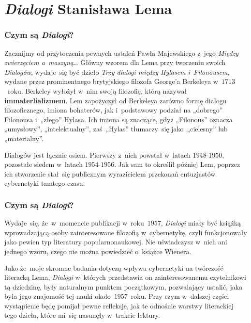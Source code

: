 \documentclass[10pt,t]{beamer}
\begin{document}
\section{\textit{Dialogi} Stanisława Lema}



\begin{frame}
  \frametitle{Czym są \textit{Dialogi}?}


  Zacznijmy od przytoczenia pewnych ustaleń Pawła Majewskiego z~jego
  \textit{Między zwierzęciem a~maszyną\ldots} Główny wzorem dla Lema przy
  tworzeniu swoich \textit{Dialogów}, wydaje~się być dzieło \textit{Trzy
    dialogi między Hylasem i~Filonousem}, wydane przez prominentnego
  brytyjskiego filozofa
  {George’a Berkeleya} w~$1713$~roku. Berkeley wyłożył w~nim swoją
  filozofię, którą nazywał \textbf{immaterlializmem}. Lem zapożyczył od
  Berkeleya zarówno formę dialogu filozoficznego, imiona bohaterów, jak
  i~podstawowy podział na „dobrego” Filonousa i~„złego” Hylasa. Ich imiona
  są znaczące, gdyż „Filonous” oznacza „umysłowy”, „intelektualny”,
  zaś~„Hylas” tłumaczy~się jako~„cielesny” lub „materialny”.

  Dialogów jest łącznie osiem. Pierwszy z~nich powstał w~latach
  $1948\text{-}1950$, pozostałe siedem w~latach $1954\text{-}1956$. Jak sam
  to określił później Lem, poprzez ich stworzenie stał~się publicznym
  wyrazicielem przekonań entuzjastów cybernetyki tamtego czasu.

\end{frame}





\begin{frame}
  \frametitle{Czym są \textit{Dialogi}?}


  Wydaje~się, że~w~momencie publikacji w~roku~$1957$, \textit{Dialogi} miały
  być książką wprowadzającą osoby zainteresowane filozofią w~cybernetykę,
  czyli funkcjonowały jako pewien typ literatury popularnonaukowej.
  Nie uświadczysz w~nich ani jednego wzoru, czego nie można powiedzieć
  o~książce Wienera.

  Jako że~moje skromne badania dotyczą wpływu cybernetyki na twórczość
  literacką Lema, \textit{Dialogi} w~których przedstawia on zainteresowanemu
  czytelnikowi tą dziedzinę, były naturalnym punktem początkowym,
  pozwalający ustalić, jaka była jego znajomość tej nauki
  około~$1957$~roku. Przy czym w~dalszej części wystąpienie będę pomijał
  pewne refleksje, jak te odnośnie warstwy literackiej tego dzieła, które
  mi~się nasunęły w~trakcie lektury.

\end{frame}
\end{document}
